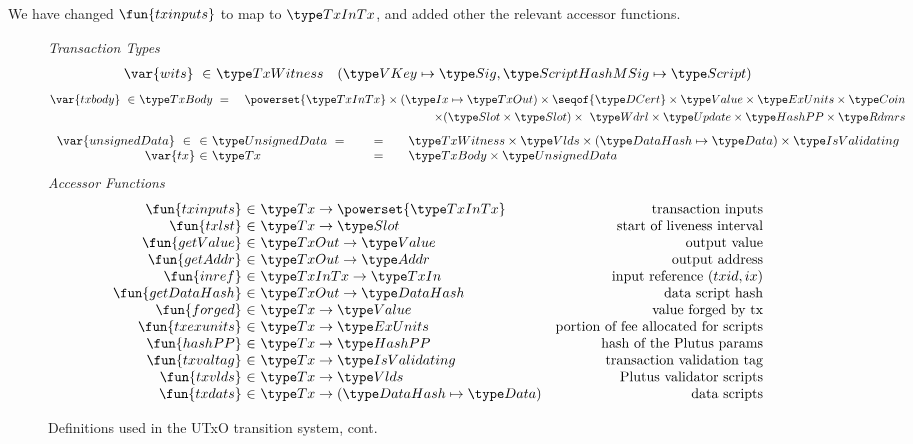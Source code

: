We have changed $\fun{txinputs}$ to map to $\TxInTx$, and added other the relevant
accessor functions.

\begin{figure*}[htb]
  \emph{Transaction Types}
  \begin{align*}
    \var{wits} ~\in~ & \TxWitness & (\VKey \mapsto \Sig, \ScriptHashMSig \mapsto \Script)
  \end{align*}
  \begin{align*}
    \var{txbody} ~\in~
    & \TxBody ~=~
    & \powerset{\TxInTx} \times (\Ix \mapsto \TxOut) \times \seqof{\DCert}
      \times \Value \times \ExUnits \times \Coin \\
    & ~& \times (\Slot\times\Slot) \times~ \Wdrl \times \Update \times \HashPP \times \Rdmrs
  \end{align*}
  \begin{equation*}
    \begin{array}{r@{~\in~}l@{\qquad=\qquad}l}
      \var{unsignedData} ~\in~
      & \UnsignedData ~=~
      & \TxWitness \times \Vlds \times (\DataHash \mapsto \Data)
            \times \IsValidating
      \\
      \var{tx}
      & \Tx
      & \TxBody \times \UnsignedData
    \end{array}
  \end{equation*}
  \emph{Accessor Functions}
  \begin{equation*}
    \begin{array}{r@{~\in~}lr}
      \fun{txinputs} & \Tx \to \powerset{\TxInTx} & \text{transaction inputs} \\
      \fun{txlst} & \Tx \to \Slot & \text{start of liveness interval} \\
      \fun{getValue} & \TxOut \to \Value & \text{output value} \\
      \fun{getAddr} & \TxOut \to \Addr & \text{output address} \\
      \fun{inref} & \TxInTx \to \TxIn & \text{input reference $(txid,ix)$} \\
      \fun{getDataHash} & \TxOut \to \DataHash & \text{data script hash} \\
      \fun{forged} & \Tx \to \Value & \text{value forged by tx}\\
      \fun{txexunits} & \Tx \to \ExUnits & \text{portion of fee allocated for scripts}\\
      \fun{hashPP} & \Tx \to \HashPP & \text{hash of the Plutus params}\\
      \fun{txvaltag} & \Tx \to \IsValidating & \text{transaction validation tag}\\
      \fun{txvlds} & \Tx \to \Vlds & \text{Plutus validator scripts}\\
      \fun{txdats} & \Tx \to (\DataHash \mapsto \Data) & \text{data scripts}\\
    \end{array}
  \end{equation*}
  \caption{Definitions used in the UTxO transition system, cont.}
  \label{fig:defs:utxo-shelley-2}
\end{figure*}

